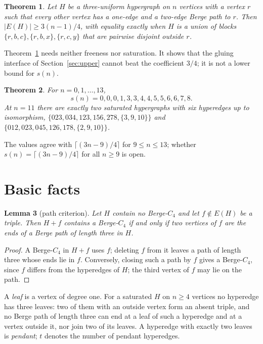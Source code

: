 \documentclass[11pt]{article}
\newtheorem{theorem}{Theorem}
\newtheorem{lemma}[theorem]{Lemma}
\theoremstyle{remark}
\begin{document}
\begin{theorem}\label{thm:root}
Let $H$ be a three-uniform hypergraph on $n$ vertices with a vertex $r$
such that every other vertex has a one-edge and a two-edge Berge path to
$r$. Then $|E(H)|\ge3(n-1)/4$, with equality exactly when $H$ is a union of
blocks $\{r,b,c\},\{r,b,x\},\{r,c,y\}$ that are pairwise disjoint outside
$r$.
\end{theorem}

Theorem~\ref{thm:root} needs neither freeness nor saturation. It shows
that the gluing interface of Section~\ref{sec:upper} cannot beat the
coefficient $3/4$; it is not a lower bound for $s(n)$.

\begin{theorem}\label{thm:small}
For $n=0,1,\dots,13$,
\[
s(n)=0,0,0,1,3,3,4,4,5,5,6,6,7,8 .
\]
At $n=11$ there are exactly two saturated hypergraphs with six hyperedges
up to isomorphism, $\{023,034,123,156,278,\{3,9,10\}\}$ and
$\{012,023,045,126,178,\{2,9,10\}\}$.
\end{theorem}

The values agree with $\lceil(3n-9)/4\rceil$ for $9\le n\le13$; whether
$s(n)=\lceil(3n-9)/4\rceil$ for all $n\ge9$ is open.

\section{Basic facts}\label{sec:basic}

\begin{lemma}[path criterion]\label{lem:path}
Let $H$ contain no Berge-$C_4$ and let $f\notin E(H)$ be a triple. Then
$H+f$ contains a Berge-$C_4$ if and only if two vertices of $f$ are the
ends of a Berge path of length three in $H$.
\end{lemma}

\begin{proof}
A Berge-$C_4$ in $H+f$ uses $f$; deleting $f$ from it leaves a path of
length three whose ends lie in $f$. Conversely, closing such a path by $f$
gives a Berge-$C_4$, since $f$ differs from the hyperedges of $H$; the
third vertex of $f$ may lie on the path.
\end{proof}

A \emph{leaf} is a vertex of degree one. For a saturated $H$ on $n\ge4$
vertices no hyperedge has three leaves: two of them with an outside vertex
form an absent triple, and no Berge path of length three can end at a leaf
of such a hyperedge and at a vertex outside it, nor join two of its
leaves. A hyperedge with exactly two leaves is \emph{pendant}; $t$ denotes
the number of pendant hyperedges.
\end{document}
